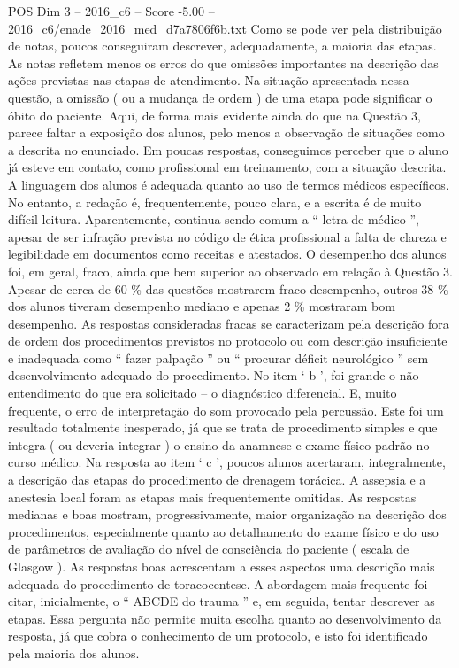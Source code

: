 \begin{textsample}{POS Dim 3 – 2016\_c6 – Score -5.00 – 2016\_c6/enade\_2016\_med\_d7a7806f6b.txt}
Como se pode ver pela distribuição de notas, poucos conseguiram descrever, adequadamente, a maioria das etapas.
As notas refletem menos os erros do que omissões importantes na descrição das ações previstas nas etapas de atendimento.
Na situação apresentada nessa questão, a omissão ( ou a mudança de ordem ) de uma etapa pode significar o óbito do paciente.
Aqui, de forma mais evidente ainda do que na Questão 3, parece faltar a exposição dos alunos, pelo menos a observação de situações como a descrita no enunciado.
Em poucas respostas, conseguimos perceber que o aluno já esteve em contato, como profissional em treinamento, com a situação descrita.
A linguagem dos alunos é adequada quanto ao uso de termos médicos específicos.
No entanto, a redação é, frequentemente, pouco clara, e a escrita é de muito difícil leitura.
Aparentemente, continua sendo comum a “ letra de médico ”, apesar de ser infração prevista no código de ética profissional a falta de clareza e legibilidade em documentos como receitas e atestados.
O desempenho dos alunos foi, em geral, fraco, ainda que bem superior ao observado em relação à Questão 3.
Apesar de cerca de 60 \% das questões mostrarem fraco desempenho, outros 38 \% dos alunos tiveram desempenho mediano e apenas 2 \% mostraram bom desempenho.
As respostas consideradas fracas se caracterizam pela descrição fora de ordem dos procedimentos previstos no protocolo ou com descrição insuficiente e inadequada como “ fazer palpação ” ou “ procurar déficit neurológico ” sem desenvolvimento adequado do procedimento.
No item ‘ b ’, foi grande o não entendimento do que era solicitado – o diagnóstico diferencial.
E, muito frequente, o erro de interpretação do som provocado pela percussão.
Este foi um resultado totalmente inesperado, já que se trata de procedimento simples e que integra ( ou deveria integrar ) o ensino da anamnese e exame físico padrão no curso médico.
Na resposta ao item ‘ c ’, poucos alunos acertaram, integralmente, a descrição das etapas do procedimento de drenagem torácica.
A assepsia e a anestesia local foram as etapas mais frequentemente omitidas.
As respostas medianas e boas mostram, progressivamente, maior organização na descrição dos procedimentos, especialmente quanto ao detalhamento do exame físico e do uso de parâmetros de avaliação do nível de consciência do paciente ( escala de Glasgow ).
As respostas boas acrescentam a esses aspectos uma descrição mais adequada do procedimento de toracocentese.
A abordagem mais frequente foi citar, inicialmente, o “ ABCDE do trauma ” e, em seguida, tentar descrever as etapas.
Essa pergunta não permite muita escolha quanto ao desenvolvimento da resposta, já que cobra o conhecimento de um protocolo, e isto foi identificado pela maioria dos alunos.

\end{textsample}
